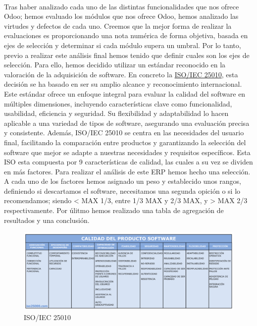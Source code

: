 \paragraph{}
Tras haber analizado cada uno de las distintas funcionalidades que nos ofrece Odoo; hemos evaluado los módulos que nos ofrece Odoo, hemos analizado las virtudes y defectos de cada uno. Creemos que la mejor forma de realizar la evaluaciones es proporcionando una nota numérica de forma objetiva, basada en ejes de selección y determinar si cada módulo supera un umbral. Por lo tanto, previo a realizar este análisis final hemos tenido que definir cuales son los ejes de selección. Para ello, hemos decidido utilizar un estándar reconocido en la valoración de la adquisición de software. En concreto la \href{https://iso25000.com/index.php/normas-iso-25000/iso-25010}{ISO/IEC 25010}, esta decisión se ha basado en ser su amplio alcance y reconocimiento internacional. Este estándar ofrece un enfoque integral para evaluar la calidad del software en múltiples dimensiones, incluyendo características clave como funcionalidad, usabilidad, eficiencia y seguridad. Su flexibilidad y adaptabilidad lo hacen aplicable a una variedad de tipos de software, asegurando una evaluación precisa y consistente. Además, ISO/IEC 25010 se centra en las necesidades del usuario final, facilitando la comparación entre productos y garantizando la selección del software que mejor se adapte a nuestras necesidades y requisitos específicos. Esta ISO esta compuesta por 9 características de calidad, las cuales a su vez se dividen en más factores. Para realizar el análisis de este ERP hemos hecho una selección. A cada uno de los factores hemos asignado un peso y establecido unos rangos, definiendo si descartamos el software, necesitamos una segunda opición o si lo recomendamos; siendo \textless{} MAX 1/3, entre 1/3 MAX y 2/3 MAX, y \textgreater{} MAX 2/3 respectivamente. Por úlitmo hemos realizado una tabla de agregación de resultados y una conclusión.

\begin{figure}
    \centering
    \includegraphics[width=1\linewidth]{final/isoo.png}
    \caption{ISO/IEC 25010}
    \label{fig:enter-label}
\end{figure}

